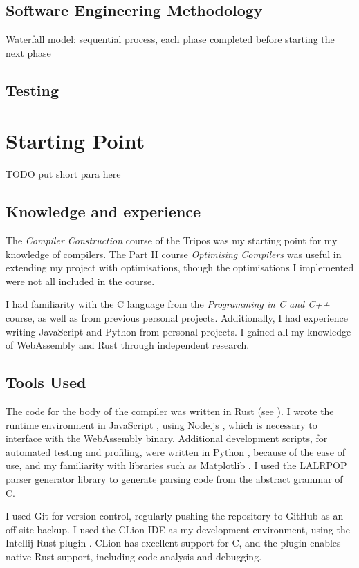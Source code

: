 \documentclass[00-main.tex]{subfiles}
\begin{document}
\subsection{Software Engineering Methodology}

\begin{mrwComment}
Waterfall model: sequential process, each phase completed before starting the next phase
\end{mrwComment}

\subsection{Testing}

\section{Starting Point}

\begin{mrwComment}
TODO put short para here
\end{mrwComment}

\subsection{Knowledge and experience}

The \emph{Compiler Construction} course of the Tripos was my starting point for my knowledge of compilers.
The Part II course \emph{Optimising Compilers} was useful in extending my project with optimisations, though the optimisations I implemented were not all included in the course.

I had familiarity with the C language from the \emph{Programming in C and C++} course, as well as from previous personal projects.
Additionally, I had experience writing JavaScript and Python from personal projects.
I gained all my knowledge of WebAssembly and Rust through independent research.

\subsection{Tools Used}

The code for the body of the compiler was written in Rust (see ).
I wrote the runtime environment in JavaScript , using Node.js , which is necessary to interface with the WebAssembly binary.
Additional development scripts, for automated testing and profiling, were written in Python , because of the ease of use, and my familiarity with libraries such as Matplotlib .
I used the LALRPOP parser generator library  to generate parsing code from the abstract grammar of C.

I used Git  for version control, regularly pushing the repository to GitHub  as an off-site backup.
I used the CLion IDE as my development environment, using the Intellij Rust plugin .
CLion has excellent support for C, and the plugin enables native Rust support, including code analysis and debugging.
\end{document}
